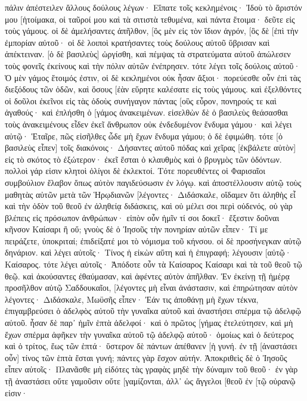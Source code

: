 πάλιν ἀπέστειλεν ἄλλους δούλους λέγων· Εἴπατε τοῖς κεκλημένοις· Ἰδοὺ τὸ ἄριστόν μου [ἡτοίμακα, οἱ ταῦροί μου καὶ τὰ σιτιστὰ τεθυμένα, καὶ πάντα ἕτοιμα· δεῦτε εἰς τοὺς γάμους. 
οἱ δὲ ἀμελήσαντες ἀπῆλθον, [ὃς μὲν εἰς τὸν ἴδιον ἀγρόν, [ὃς δὲ [ἐπὶ τὴν ἐμπορίαν αὐτοῦ· 
οἱ δὲ λοιποὶ κρατήσαντες τοὺς δούλους αὐτοῦ ὕβρισαν καὶ ἀπέκτειναν. 
[ὁ δὲ βασιλεὺς] ὠργίσθη, καὶ πέμψας τὰ στρατεύματα αὐτοῦ ἀπώλεσεν τοὺς φονεῖς ἐκείνους καὶ τὴν πόλιν αὐτῶν ἐνέπρησεν. 
τότε λέγει τοῖς δούλοις αὐτοῦ· Ὁ μὲν γάμος ἕτοιμός ἐστιν, οἱ δὲ κεκλημένοι οὐκ ἦσαν ἄξιοι· 
πορεύεσθε οὖν ἐπὶ τὰς διεξόδους τῶν ὁδῶν, καὶ ὅσους [ἐὰν εὕρητε καλέσατε εἰς τοὺς γάμους. 
καὶ ἐξελθόντες οἱ δοῦλοι ἐκεῖνοι εἰς τὰς ὁδοὺς συνήγαγον πάντας [οὓς εὗρον, πονηρούς τε καὶ ἀγαθούς· καὶ ἐπλήσθη ὁ [γάμος ἀνακειμένων. 
εἰσελθὼν δὲ ὁ βασιλεὺς θεάσασθαι τοὺς ἀνακειμένους εἶδεν ἐκεῖ ἄνθρωπον οὐκ ἐνδεδυμένον ἔνδυμα γάμου· 
καὶ λέγει αὐτῷ· Ἑταῖρε, πῶς εἰσῆλθες ὧδε μὴ ἔχων ἔνδυμα γάμου; ὁ δὲ ἐφιμώθη. 
τότε [ὁ βασιλεὺς εἶπεν] τοῖς διακόνοις· Δήσαντες αὐτοῦ πόδας καὶ χεῖρας [ἐκβάλετε αὐτὸν] εἰς τὸ σκότος τὸ ἐξώτερον· ἐκεῖ ἔσται ὁ κλαυθμὸς καὶ ὁ βρυγμὸς τῶν ὀδόντων. 
πολλοὶ γάρ εἰσιν κλητοὶ ὀλίγοι δὲ ἐκλεκτοί. 
Τότε πορευθέντες οἱ Φαρισαῖοι συμβούλιον ἔλαβον ὅπως αὐτὸν παγιδεύσωσιν ἐν λόγῳ. 
καὶ ἀποστέλλουσιν αὐτῷ τοὺς μαθητὰς αὐτῶν μετὰ τῶν Ἡρῳδιανῶν [λέγοντες· Διδάσκαλε, οἴδαμεν ὅτι ἀληθὴς εἶ καὶ τὴν ὁδὸν τοῦ θεοῦ ἐν ἀληθείᾳ διδάσκεις, καὶ οὐ μέλει σοι περὶ οὐδενός, οὐ γὰρ βλέπεις εἰς πρόσωπον ἀνθρώπων· 
εἰπὸν οὖν ἡμῖν τί σοι δοκεῖ· ἔξεστιν δοῦναι κῆνσον Καίσαρι ἢ οὔ; 
γνοὺς δὲ ὁ Ἰησοῦς τὴν πονηρίαν αὐτῶν εἶπεν· Τί με πειράζετε, ὑποκριταί; 
ἐπιδείξατέ μοι τὸ νόμισμα τοῦ κήνσου. οἱ δὲ προσήνεγκαν αὐτῷ δηνάριον. 
καὶ λέγει αὐτοῖς· Τίνος ἡ εἰκὼν αὕτη καὶ ἡ ἐπιγραφή; 
λέγουσιν [αὐτῷ· Καίσαρος. τότε λέγει αὐτοῖς· Ἀπόδοτε οὖν τὰ Καίσαρος Καίσαρι καὶ τὰ τοῦ θεοῦ τῷ θεῷ. 
καὶ ἀκούσαντες ἐθαύμασαν, καὶ ἀφέντες αὐτὸν ἀπῆλθαν. 
Ἐν ἐκείνῃ τῇ ἡμέρᾳ προσῆλθον αὐτῷ Σαδδουκαῖοι, [λέγοντες μὴ εἶναι ἀνάστασιν, καὶ ἐπηρώτησαν αὐτὸν 
λέγοντες· Διδάσκαλε, Μωϋσῆς εἶπεν· Ἐάν τις ἀποθάνῃ μὴ ἔχων τέκνα, ἐπιγαμβρεύσει ὁ ἀδελφὸς αὐτοῦ τὴν γυναῖκα αὐτοῦ καὶ ἀναστήσει σπέρμα τῷ ἀδελφῷ αὐτοῦ. 
ἦσαν δὲ παρ᾽ ἡμῖν ἑπτὰ ἀδελφοί· καὶ ὁ πρῶτος [γήμας ἐτελεύτησεν, καὶ μὴ ἔχων σπέρμα ἀφῆκεν τὴν γυναῖκα αὐτοῦ τῷ ἀδελφῷ αὐτοῦ· 
ὁμοίως καὶ ὁ δεύτερος καὶ ὁ τρίτος, ἕως τῶν ἑπτά· 
ὕστερον δὲ πάντων ἀπέθανεν [ἡ γυνή. 
ἐν τῇ [ἀναστάσει οὖν] τίνος τῶν ἑπτὰ ἔσται γυνή; πάντες γὰρ ἔσχον αὐτήν. 
Ἀποκριθεὶς δὲ ὁ Ἰησοῦς εἶπεν αὐτοῖς· Πλανᾶσθε μὴ εἰδότες τὰς γραφὰς μηδὲ τὴν δύναμιν τοῦ θεοῦ· 
ἐν γὰρ τῇ ἀναστάσει οὔτε γαμοῦσιν οὔτε [γαμίζονται, ἀλλ᾽ ὡς ἄγγελοι [θεοῦ ἐν [τῷ οὐρανῷ εἰσιν· 
